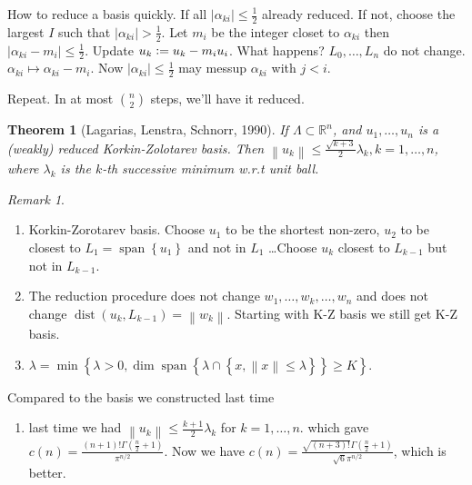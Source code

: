 \documentclass{report}
\newcommand{\R}{\mathbb{R}}
\def \dist {\operatorname{dist}}
\def \dist {\operatorname{dist}}
\newcommand{\norm}[1]{\left\| #1 \right\|}
\newcommand{\set}[1]{\left\{ #1 \right\}}
\newcommand{\defeq}{\vcentcolon=}
\newtheorem{theorem}{Theorem}[section]
\theoremstyle{definition}
\theoremstyle{remark}
\newtheorem*{remark}{Remark}
\numberwithin{equation}{section}
\begin{document}
How to reduce a basis quickly. If all $|\alpha_{ki}| \leq \frac{1}{2}$ already reduced. If not, choose the largest $I$ such that $|\alpha_{ki}| > \frac{1}{2}$. Let $m_i$ be the integer closet to $\alpha_{ki}$ then $|\alpha_{ki} - m_i| \leq \frac{1}{2}$. Update $u_k \defeq u_k - m_iu_i$. What happens? $L_0, \ldots, L_n$ do not change. $\alpha_{ki} \mapsto \alpha_{ki} - m_i$. Now $|\alpha_{ki}| \leq \frac{1}{2}$ may messup $\alpha_{ki}$ with $j < i$.

Repeat. In at most $\binom{n}{2}$ steps, we'll have it reduced.

\begin{theorem}[Lagarias, Lenstra, Schnorr, 1990]
    If $\Lambda \subset \R^n$, and $u_1, \ldots, u_n$ is a (weakly) reduced Korkin-Zolotarev basis. Then $\norm{u_k} \leq \frac{\sqrt{k+3}}{2} \lambda_k, k = 1, \ldots, n$, where $\lambda_k$ is the $k$-th successive minimum w.r.t unit ball.
\end{theorem}

\begin{remark}
    \begin{enumerate}
        \item Korkin-Zorotarev basis. Choose $u_1$ to be the shortest non-zero, $u_2$ to be closest to $L_1 = \operatorname{span}\set{u_1}$ and not in $L_1$ \ldots Choose $u_k$ closest to $L_{k-1}$ but not in $L_{k-1}$.
        \item The reduction procedure does not change $w_1, \ldots, w_k, \ldots, w_n$ and does not change $\dist(u_k, L_{k-1}) = \norm{w_k}$. Starting with K-Z basis we still get K-Z basis.
        \item $\lambda = \min\set{\lambda > 0, \dim \operatorname{span} \set{\lambda \cap \set{x, \norm{x} \leq \lambda}} \geq K}$.
    \end{enumerate}
\end{remark}

Compared to the basis we constructed last time
\begin{enumerate}
    \item last time we had $\norm{u_k} \leq \frac{k+1}{2}\lambda_k$ for $k = 1, \ldots, n$. which gave $c(n) = \frac{(n+1)!\Gamma\left(\frac{n}{2}+1\right)}{\pi^{n/2}}$. Now we have $c(n) = \frac{\sqrt{(n+3)!}\Gamma\left(\frac{n}{2}+1\right)}{\sqrt{6}\pi^{n/2}}$, which is better.
\end{enumerate}
\end{document}
